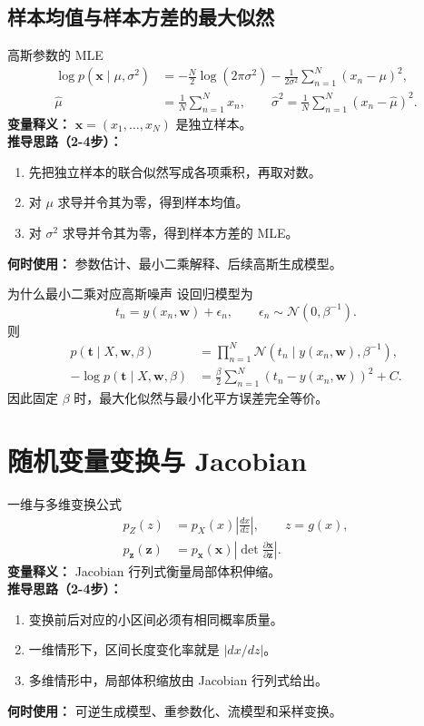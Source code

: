 \documentclass[11pt]{article}
\begin{document}
\subsection{样本均值与样本方差的最大似然}
\begin{formulabox}{高斯参数的 MLE}
\begin{align}
\log p(\mathbf{x}\mid \mu,\sigma^2)
&= -\frac{N}{2}\log(2\pi\sigma^2)-\frac{1}{2\sigma^2}\sum_{n=1}^{N}(x_n-\mu)^2, \\
\hat{\mu} &= \frac{1}{N}\sum_{n=1}^{N}x_n, \qquad
\hat{\sigma}^2 = \frac{1}{N}\sum_{n=1}^{N}(x_n-\hat{\mu})^2.
\end{align}
\textbf{变量释义：} $\mathbf{x}=(x_1,\dots,x_N)$ 是独立样本。\\
\textbf{推导思路（2-4步）：}
\begin{enumerate}[leftmargin=1.6em]
  \item 先把独立样本的联合似然写成各项乘积，再取对数。
  \item 对 $\mu$ 求导并令其为零，得到样本均值。
  \item 对 $\sigma^2$ 求导并令其为零，得到样本方差的 MLE。
\end{enumerate}
\textbf{何时使用：} 参数估计、最小二乘解释、后续高斯生成模型。
\end{formulabox}

\begin{derivationbox}{为什么最小二乘对应高斯噪声}
设回归模型为
\[
t_n = y(x_n,\mathbf{w}) + \epsilon_n,\qquad \epsilon_n\sim\mathcal{N}(0,\beta^{-1}).
\]
则
\begin{align}
p(\mathbf{t}\mid X,\mathbf{w},\beta)
&= \prod_{n=1}^{N}\mathcal{N}\!\left(t_n\mid y(x_n,\mathbf{w}),\beta^{-1}\right),\\
-\log p(\mathbf{t}\mid X,\mathbf{w},\beta)
&= \frac{\beta}{2}\sum_{n=1}^{N}(t_n-y(x_n,\mathbf{w}))^2 + C.
\end{align}
因此固定 $\beta$ 时，最大化似然与最小化平方误差完全等价。
\end{derivationbox}

\section{随机变量变换与 Jacobian}
\begin{formulabox}{一维与多维变换公式}
\begin{align}
p_Z(z) &= p_X(x)\left|\frac{dx}{dz}\right|,\qquad z=g(x),\\
p_{\mathbf z}(\mathbf z)
&= p_{\mathbf x}(\mathbf x)\left|\det\frac{\partial \mathbf x}{\partial \mathbf z}\right|.
\end{align}
\textbf{变量释义：} Jacobian 行列式衡量局部体积伸缩。\\
\textbf{推导思路（2-4步）：}
\begin{enumerate}[leftmargin=1.6em]
  \item 变换前后对应的小区间必须有相同概率质量。
  \item 一维情形下，区间长度变化率就是 $\left|dx/dz\right|$。
  \item 多维情形中，局部体积缩放由 Jacobian 行列式给出。
\end{enumerate}
\textbf{何时使用：} 可逆生成模型、重参数化、流模型和采样变换。
\end{formulabox}
\end{document}
